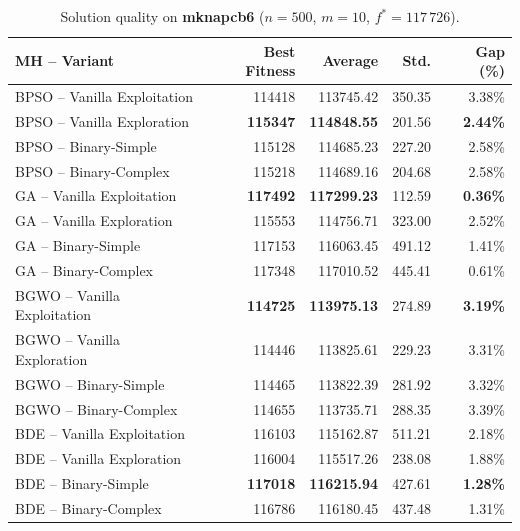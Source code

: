 \documentclass[journal,article,submit,moreauthors]{Definitions/mdpi}
\begin{document}
\begin{table}[htbp]
  \centering
  \small
  \caption{Solution quality on \textbf{mknapcb6}
  ($n=500$, $m=10$, $f^*=117\,726$).}
  \label{tab:calidad_mknapcb6}
  \begin{tabular}{lrrrr}
    \toprule
    \textbf{MH -- Variant} &
    \textbf{Best Fitness} &
    \textbf{Average} &
    \textbf{Std.} &
    \textbf{Gap (\%)} \\
    \midrule
    BPSO -- Vanilla Exploitation & 114418 & 113745.42 & 350.35 & 3.38\% \\
    BPSO -- Vanilla Exploration  & \textbf{115347} & \textbf{114848.55} & 201.56 & \textbf{2.44\%} \\
    BPSO -- Binary-Simple        & 115128 & 114685.23 & 227.20 & 2.58\% \\
    BPSO -- Binary-Complex       & 115218 & 114689.16 & 204.68 & 2.58\% \\
    \midrule
    GA -- Vanilla Exploitation   & \textbf{117492} & \textbf{117299.23} & 112.59 & \textbf{0.36\%} \\
    GA -- Vanilla Exploration    & 115553 & 114756.71 & 323.00 & 2.52\% \\
    GA -- Binary-Simple          & 117153 & 116063.45 & 491.12 & 1.41\% \\
    GA -- Binary-Complex         & 117348 & 117010.52 & 445.41 & 0.61\% \\
    \midrule
    BGWO -- Vanilla Exploitation & \textbf{114725} & \textbf{113975.13} & 274.89 & \textbf{3.19\%} \\
    BGWO -- Vanilla Exploration  & 114446 & 113825.61 & 229.23 & 3.31\% \\
    BGWO -- Binary-Simple        & 114465 & 113822.39 & 281.92 & 3.32\% \\
    BGWO -- Binary-Complex       & 114655 & 113735.71 & 288.35 & 3.39\% \\
    \midrule
    BDE -- Vanilla Exploitation  & 116103 & 115162.87 & 511.21 & 2.18\% \\
    BDE -- Vanilla Exploration   & 116004 & 115517.26 & 238.08 & 1.88\% \\
    BDE -- Binary-Simple         & \textbf{117018} & \textbf{116215.94} & 427.61 & \textbf{1.28\%} \\
    BDE -- Binary-Complex        & 116786 & 116180.45 & 437.48 & 1.31\% \\
    \bottomrule
  \end{tabular}
\end{table}
\end{document}
